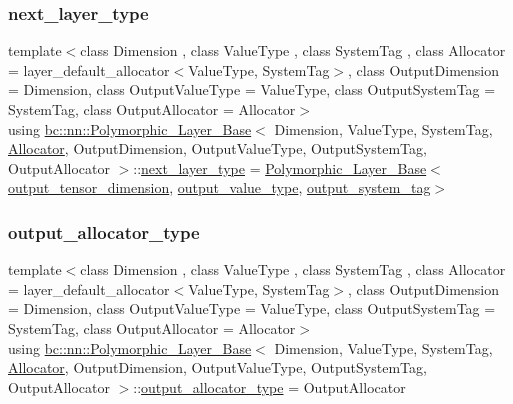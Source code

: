 \subsubsection{\texorpdfstring{next\+\_\+layer\+\_\+type}{next\_layer\_type}\hspace{0.1cm}{\footnotesize\ttfamily [2/2]}}
{\footnotesize\ttfamily template$<$class Dimension , class Value\+Type , class System\+Tag , class Allocator  = layer\+\_\+default\+\_\+allocator$<$\+Value\+Type, System\+Tag$>$, class Output\+Dimension  = Dimension, class Output\+Value\+Type  = Value\+Type, class Output\+System\+Tag  = System\+Tag, class Output\+Allocator  = Allocator$>$ \\
using \hyperlink{structbc_1_1nn_1_1Polymorphic__Layer__Base}{bc\+::nn\+::\+Polymorphic\+\_\+\+Layer\+\_\+\+Base}$<$ Dimension, Value\+Type, System\+Tag, \hyperlink{classbc_1_1allocators_1_1Allocator}{Allocator}, Output\+Dimension, Output\+Value\+Type, Output\+System\+Tag, Output\+Allocator $>$\+::\hyperlink{structbc_1_1nn_1_1Polymorphic__Layer__Base_ac7d70db83e8370d2975d05401713f677}{next\+\_\+layer\+\_\+type} =  \hyperlink{structbc_1_1nn_1_1Polymorphic__Layer__Base}{Polymorphic\+\_\+\+Layer\+\_\+\+Base}$<$ \hyperlink{structbc_1_1nn_1_1Polymorphic__Layer__Base_a099ec870d177606464f40dfb496d31a2}{output\+\_\+tensor\+\_\+dimension}, \hyperlink{structbc_1_1nn_1_1Polymorphic__Layer__Base_a15d1092569f56625cbdf8d7045e66391}{output\+\_\+value\+\_\+type}, \hyperlink{structbc_1_1nn_1_1Polymorphic__Layer__Base_aeb60d2b5eb18d542fecd5a34fc122bf0}{output\+\_\+system\+\_\+tag}$>$}

\mbox{\label{structbc_1_1nn_1_1Polymorphic__Layer__Base_a4bc904c1787b9da18e35d0c6b60ac59f}} 
\subsubsection{\texorpdfstring{output\+\_\+allocator\+\_\+type}{output\_allocator\_type}\hspace{0.1cm}{\footnotesize\ttfamily [1/2]}}
{\footnotesize\ttfamily template$<$class Dimension , class Value\+Type , class System\+Tag , class Allocator  = layer\+\_\+default\+\_\+allocator$<$\+Value\+Type, System\+Tag$>$, class Output\+Dimension  = Dimension, class Output\+Value\+Type  = Value\+Type, class Output\+System\+Tag  = System\+Tag, class Output\+Allocator  = Allocator$>$ \\
using \hyperlink{structbc_1_1nn_1_1Polymorphic__Layer__Base}{bc\+::nn\+::\+Polymorphic\+\_\+\+Layer\+\_\+\+Base}$<$ Dimension, Value\+Type, System\+Tag, \hyperlink{classbc_1_1allocators_1_1Allocator}{Allocator}, Output\+Dimension, Output\+Value\+Type, Output\+System\+Tag, Output\+Allocator $>$\+::\hyperlink{structbc_1_1nn_1_1Polymorphic__Layer__Base_a4bc904c1787b9da18e35d0c6b60ac59f}{output\+\_\+allocator\+\_\+type} =  Output\+Allocator}

